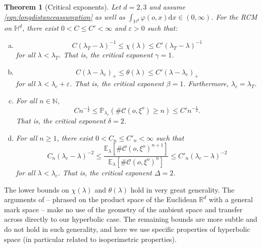 \documentclass[10pt,a4paper,dvipsnames]{article}
\newtheorem{theorem}{Theorem}[section]
\theoremstyle{definition}
\theoremstyle{remark}
\newcommand{\p}{\mathbb P}
\newcommand{\ela}{\mathbb E_{\lambda}}
\newcommand{\Rd}{\mathbb R^d}
\newcommand{\N}{\mathbb N}
\newcommand{\HypDim}{{\mathbb{H}^d}}
\newcommand{\dd}{\mathrm{d}} %
\newcommand{\C}{\mathscr {C}}
\newcommand{\orig}{o}
\newcommand{\connf}{\varphi}
\numberwithin{equation}{section}
\begin{document}
\begin{theorem}[Critical exponents]
\label{thm:CritExponents}
    Let $d=2,3$ and assume \eqref{eqn:longdistanceassumption} as well as $\int_\HypDim\connf(\orig,x)\dd x \in(0,\infty)$. For the RCM on $\HypDim$, there exist $0<C\leq C'<\infty$ and $\varepsilon>0$ such that: 
    \begin{enumerate}[(a)]
    \item \label{thm:CritExponents - Susceptibility}
    \begin{equation}
        C\left(\lambda_T-\lambda\right)^{-1} \leq \chi(\lambda) \leq C'\left(\lambda_T-\lambda\right)^{-1}
    \end{equation}
    for all $\lambda<\lambda_T$. That is, the critical exponent $\gamma=1$.

    \item \label{thm:CritExponents - Percolation}
    \begin{equation}
        C\left(\lambda-\lambda_c\right)_+ \leq \theta(\lambda) \leq C'\left(\lambda-\lambda_c\right)_+
    \end{equation}
    for all $\lambda<\lambda_c+\varepsilon$. That is, the critical exponent $\beta=1$. Furthermore, $\lambda_c=\lambda_T$.
    \item \label{thm:CritExponents - tailexponent}
    For all $n\in\N$,
    \begin{equation}
        Cn^{-\frac{1}{2}}\leq \p_{\lambda_c}\left(\#\C\left(\orig,\xi^\orig\right)\geq n\right) \leq C'n^{-\frac{1}{2}}.
    \end{equation}
    That is, the critical exponent $\delta=2$.
    \item \label{thm:CritExponents - SusceptibilityMoment}
    For all $n\geq 1$, there exist $0<C_n\leq C'_n<\infty$ such that
    \begin{equation}
    \label{eqn:thmpartd}
        C_n\left(\lambda_c-\lambda\right)^{-2} \leq \frac{\ela\left[\#\C\left(\orig,\xi^\orig\right)^{n+1}\right]}{\ela\left[\#\C\left(\orig,\xi^\orig\right)^{n}\right]} \leq C'_n\left(\lambda_c-\lambda\right)^{-2}
    \end{equation}
    for all $\lambda<\lambda_c$. That is, the critical exponent $\Delta=2$.
    \end{enumerate}
\end{theorem}

The lower bounds on $\chi(\lambda)$ and $\theta(\lambda)$ hold in very great generality. The arguments of \cite{caicedo2023critical} -- phrased on the product space of the Euclidean $\Rd$ with a general mark space -- make no use of the geometry of the ambient space and transfer across directly to our hyperbolic case. The remaining bounds are more subtle and do not hold in such generality, and here we use specific properties of hyperbolic space (in particular related to isoperimetric properties).
\end{document}
